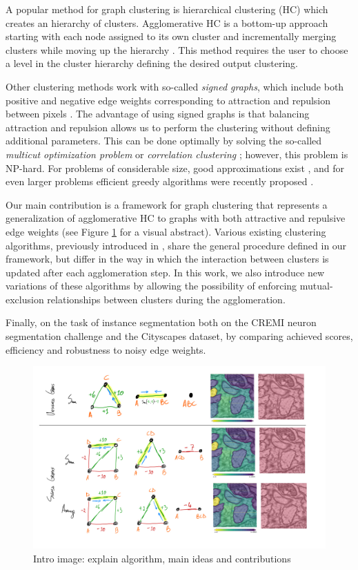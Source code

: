 A popular method for graph clustering is hierarchical clustering (HC) which creates an hierarchy of clusters. Agglomerative HC is a bottom-up approach starting with each node assigned to its own cluster and incrementally merging clusters while moving up the hierarchy \cite{lance1967general}. This method requires the user to choose a level in the cluster hierarchy defining the desired output clustering. 

Other clustering methods work with so-called \emph{signed graphs}, which include both positive and negative edge weights corresponding to attraction and repulsion between pixels . The advantage of using signed graphs is that balancing attraction and repulsion allows us to perform the clustering without defining additional parameters. This can be done optimally by solving the so-called \emph{multicut optimization problem} or \emph{correlation clustering} \cite{kappes2011globally,chopra1991multiway}; however, this problem is NP-hard. For problems of considerable size, good approximations exist \cite{yarkony2012fast,pape2017solving}, and for even larger problems efficient greedy algorithms were recently proposed \cite{levinkov2017comparative,wolf2018mutex}.

Our main contribution is a framework for graph clustering that represents a generalization of agglomerative HC to graphs with both attractive and repulsive edge weights (see Figure \ref{fig:intro_figure} for a visual abstract). 
Various existing clustering algorithms, previously introduced in \cite{levinkov2017comparative,wolf2018mutex,lance1967general}, share the general procedure defined in our framework, but differ in the way in which the interaction between clusters is updated after each agglomeration step. In this work, we also introduce new variations of these algorithms by allowing the possibility of enforcing mutual-exclusion relationships between clusters during the agglomeration.  

Finally,  on the task of instance segmentation both on the CREMI neuron segmentation challenge and the Cityscapes dataset, by comparing achieved scores, efficiency and robustness to noisy edge weights.  




\begin{figure}[t]
\centering
\includegraphics[width=\textwidth,trim=0.4in 1.2in 0.in 0.05in,clip]{./figs/intro_image.jpg} %
\caption{\small 
Intro image: explain algorithm, main ideas and contributions
\label{fig:intro_figure}}
\end{figure}
